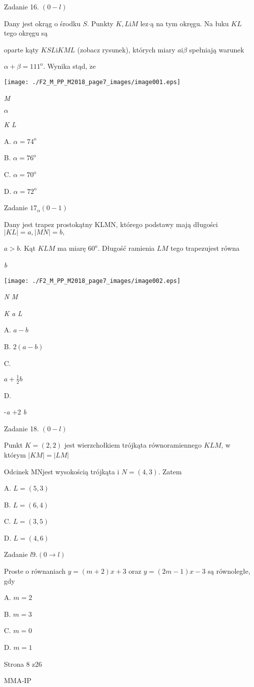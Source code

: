\documentclass[a4paper,12pt]{article}
\begin{document}
Zadanie 16. $(0-l)$

Dany jest okrąg o środku $S$. Punkty $K, L\mathrm{i}M$ lez$\cdot$ą na tym okręgu. Na łuku $KL$ tego okręgu są

oparte kąty $KSL \mathrm{i} KML$ (zobacz rysunek), których miary $a \mathrm{i} \beta$ spełniają warunek

$\alpha+\beta=111^{\mathrm{o}}$. Wynika stąd, $\dot{\mathrm{z}}\mathrm{e}$
\begin{center}
\texttt{[image: ./F2\_M\_PP\_M2018\_page7\_images/image001.eps]}
\end{center}
{\it M}

$\alpha$

{\it K  L}

A. $\alpha=74^{\mathrm{o}}$

B. $\alpha=76^{\mathrm{o}}$

C. $\alpha=70^{\mathrm{o}}$

D. $\alpha=72^{\mathrm{o}}$

Zadanie $17_{\alpha}(0-1)$

Dany jest trapez prostokątny KLMN, którego podstawy mają długości $|KL|=a, |MN|=b,$

$a>b$. Kąt $KLM$ ma miarę $60^{\mathrm{o}}$. Długość ramienia $LM$ tego trapezujest równa

{\it b}
\begin{center}
\texttt{[image: ./F2\_M\_PP\_M2018\_page7\_images/image002.eps]}
\end{center}
{\it N  M}

{\it K  a  L}

A. $a-b$

B. $2(a-b)$

C.

$a+\displaystyle \frac{1}{2}b$

D.

-{\it a} $+$2 {\it b}

Zadanie 18. $(0-l)$

Punkt $K=(2,2)$ jest wierzchołkiem trójkąta równoramiennego $KLM$, w którym $|KM|=|LM|$

Odcinek MNjest wysokością trójkąta i $N=(4,3)$. Zatem

A. $L=(5,3)$

B. $L=(6,4)$

C. $L=(3,5)$

D. $L=(4,6)$

Zadanie $l9. (0\rightarrow l)$

Proste o równaniach $y=(m+2)x+3$ oraz $y=(2m-1)x-3$ są równoległe, gdy

A. $m=2$

B. $m=3$

C. $m=0$

D. $m=1$

Strona 8 z26

MMA-IP
\end{document}
